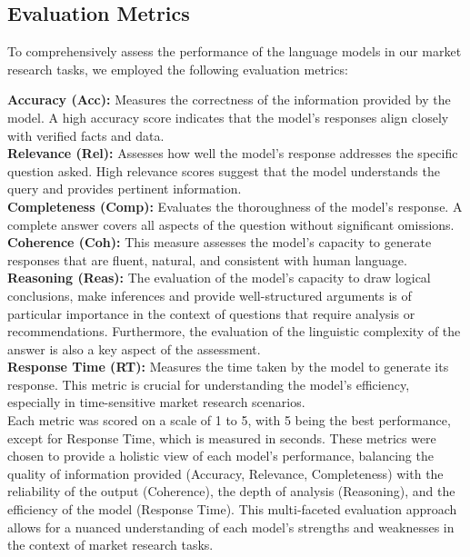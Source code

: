 \documentclass[12pt,a4paper]{article}
\begin{document}
	\subsection{Evaluation Metrics}
	To comprehensively assess the performance of the language models in our market research tasks, we employed the following evaluation metrics:
	
	\textbf{Accuracy (Acc):} Measures the correctness of the information provided by the model. A high accuracy score indicates that the model's responses align closely with verified facts and data.\\
	\textbf{Relevance (Rel):} Assesses how well the model's response addresses the specific question asked. High relevance scores suggest that the model understands the query and provides pertinent information.\\
	\textbf{Completeness (Comp):} Evaluates the thoroughness of the model's response. A complete answer covers all aspects of the question without significant omissions.\\
	\textbf{Coherence (Coh):} This measure assesses the model's capacity to generate responses that are fluent, natural, and consistent with human language.\\
	\textbf{Reasoning (Reas):} The evaluation of the model's capacity to draw logical conclusions, make inferences and provide well-structured arguments is of particular importance in the context of questions that require analysis or recommendations.
	Furthermore, the evaluation of the linguistic complexity of the answer is also a key aspect of the assessment.\\
	\textbf{Response Time (RT):} Measures the time taken by the model to generate its response. This metric is crucial for understanding the model's efficiency, especially in time-sensitive market research scenarios.\\
	
Each metric was scored on a scale of 1 to 5, with 5 being the best performance, except for Response Time, which is measured in seconds. 
These metrics were chosen to provide a holistic view of each model's performance, balancing the quality of information provided (Accuracy, Relevance, Completeness) with the reliability of the output (Coherence), the depth of analysis (Reasoning), and the efficiency of the model (Response Time). This multi-faceted evaluation approach allows for a nuanced understanding of each model's strengths and weaknesses in the context of market research tasks.
	
\end{document}
